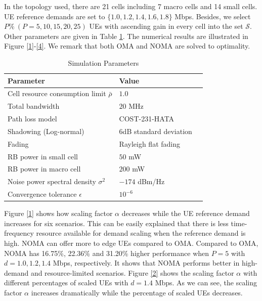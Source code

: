 \documentclass[10pt,journal,final,finalsubmission,twocolumn]{IEEEtran}
\begin{document}
In the topology used, there are 21 cells including 7 macro cells and 14 small cells. UE reference demands are set to $\{1.0, 1.2, 1.4, 1.6, 1.8\}$ Mbps. Besides, we select $P\%\ (P=5, 10, 15, 20, 25)$ UEs with ascending gain in every cell into the set $\mathcal{S}$. Other parameters are given in Table \ref{tab:test}. The numerical results are illustrated in Figure \ref{1}-\ref{4}. We remark that both OMA and NOMA are solved to optimality.


\begin{table}[htbp]
 \caption{\label{tab:test}Simulation Parameters}
 \begin{center}
 \begin{tabular}{lll}
  \toprule
  \textbf{Parameter} & \textbf{Value}  \\
  \midrule
 Cell resource consumption limit $\bar{\rho}$ & $1.0$  \\
 Total bandwidth & $20$ MHz  \\
 Path loss model & COST-231-HATA\\
 Shadowing (Log-normal) &$6$dB standard deviation\\
 Fading &Rayleigh flat fading\\
 RB power in small cell & $50$ mW \\
 RB power in macro cell & $200$ mW \\
  Noise power spectral density $\sigma ^2$ & $-174$ dBm/Hz  \\
 Convergence tolerance $\epsilon$ & $10^{-6}$ \\

  \bottomrule
 \end{tabular}
  \end{center}
\end{table}


Figure \ref{1} shows how scaling factor $\alpha$ decreases while the UE reference demand increases for six scenarios. This can be easily explained that there is less time-frequency resource available for demand scaling when the reference demand is high. NOMA can offer more to edge UEs compared to OMA. Compared to OMA, NOMA has 16.75\%, 22.36\% and 31.20\% higher performance when $P=5$ with $d=1.0, 1.2, 1.4$ Mbps, respectively. It shows that NOMA performs better in high-demand and resource-limited scenarios. Figure \ref{2} shows the scaling factor $\alpha $ with different percentages of scaled UEs with $d = 1.4$ Mbps. As we can see, the scaling factor $\alpha$ increases dramatically while the percentage of scaled UEs decreases. 
\end{document}

